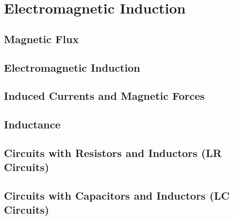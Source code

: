 \documentclass[../em.tex]{subfiles}
\begin{document}
\chapter{Electromagnetic Induction}
\section{Magnetic Flux}
\section{Electromagnetic Induction}
\section{Induced Currents and Magnetic Forces}
\section{Inductance}
\section{Circuits with Resistors and Inductors (LR Circuits)}
\section{Circuits with Capacitors and Inductors (LC Circuits)}
\end{document}
